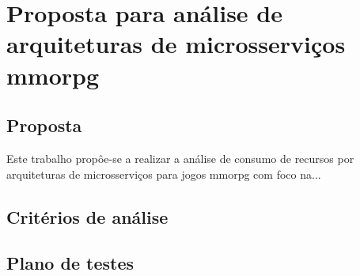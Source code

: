 \chapter{Proposta para análise de arquiteturas de microsserviços \ac{mmorpg}}
\label{cap3}

\section{Proposta}

Este trabalho propôe-se a realizar a análise de consumo de recursos por arquiteturas de microsserviços para jogos \ac{mmorpg} com foco na...

\section{Critérios de análise}

\section{Plano de testes}
